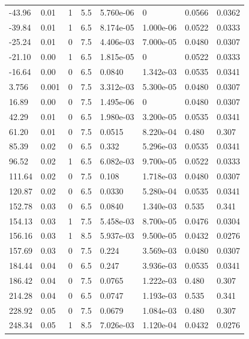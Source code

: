 \documentclass[preview]{standalone}
\begin{document}
{{\begin{tabular}{L{1.2cm}C{1.2cm} C{0.3cm}C{0.5cm} C{1.4cm}C{1.4cm} C{1.4cm}C{1.4cm}}
  -43.96  &  0.01  & 1     & 5.5 &  5.760e-06  & 0  & 0.0566 &  0.0362   \\ 
  -39.84  &  0.01  & 1     & 6.5 &  8.174e-05  & 1.000e-06  & 0.0522 &  0.0333   \\ 
  -25.24  &  0.01  & 0     & 7.5 &  4.406e-03  & 7.000e-05  & 0.0480 &  0.0307   \\ 
  -21.10  &  0.00  & 1     & 6.5 &  1.815e-05  & 0  & 0.0522 &  0.0333   \\ 
  -16.64  &  0.00  & 0     & 6.5 &  0.0840  & 1.342e-03  & 0.0535 &  0.0341   \\ 
  3.756  &  0.001  & 0     & 7.5 &  3.312e-03  & 5.300e-05  & 0.0480 &  0.0307   \\ 
  16.89  &  0.00  & 0     & 7.5 &  1.495e-06  & 0  & 0.0480 &  0.0307   \\ 
  42.29  &  0.01  & 0     & 6.5 &  1.980e-03  & 3.200e-05  & 0.0535 &  0.0341   \\ 
  61.20  &  0.01  & 0     & 7.5 &  0.0515  & 8.220e-04  & 0.480 &  0.307   \\ 
  85.39  &  0.02  & 0     & 6.5 &  0.332  & 5.296e-03  & 0.0535 &  0.0341   \\ 
  96.52  &  0.02  & 1     & 6.5 &  6.082e-03  & 9.700e-05  & 0.0522 &  0.0333   \\ 
  111.64  &  0.02  & 0     & 7.5 &  0.108  & 1.718e-03  & 0.0480 &  0.0307   \\ 
  120.87  &  0.02  & 0     & 6.5 &  0.0330  & 5.280e-04  & 0.0535 &  0.0341   \\ 
  152.78  &  0.03  & 0     & 6.5 &  0.0840  & 1.340e-03  & 0.535 &  0.341   \\ 
  154.13  &  0.03  & 1     & 7.5 &  5.458e-03  & 8.700e-05  & 0.0476 &  0.0304   \\ 
  156.16  &  0.03  & 1     & 8.5 &  5.937e-03  & 9.500e-05  & 0.0432 &  0.0276   \\ 
  157.69  &  0.03  & 0     & 7.5 &  0.224  & 3.569e-03  & 0.0480 &  0.0307   \\ 
  184.44  &  0.04  & 0     & 6.5 &  0.247  & 3.936e-03  & 0.0535 &  0.0341   \\ 
  186.42  &  0.04  & 0     & 7.5 &  0.0765  & 1.222e-03  & 0.480 &  0.307   \\ 
  214.28  &  0.04  & 0     & 6.5 &  0.0747  & 1.193e-03  & 0.535 &  0.341   \\ 
  228.92  &  0.05  & 0     & 7.5 &  0.0679  & 1.084e-03  & 0.480 &  0.307   \\ 
  248.34  &  0.05  & 1     & 8.5 &  7.026e-03  & 1.120e-04  & 0.0432 &  0.0276   \\ 

\end{tabular}}}
\end{document}
